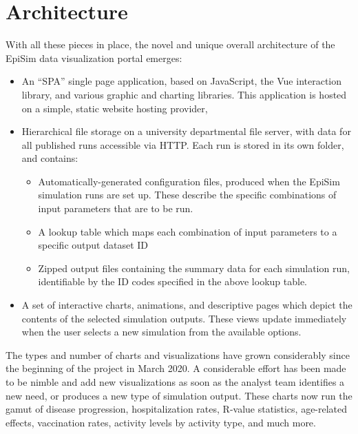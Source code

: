 \hypertarget{covid-architecture}{%
\section{Architecture}\label{architecture}}

With all these pieces in place, the novel and unique overall architecture of the EpiSim data visualization portal emerges:

\begin{itemize}
\item
  An ``SPA'' single page application, based on JavaScript, the Vue interaction library, and various graphic and charting libraries. This application is hosted on a simple, static website hosting provider,
\item
  Hierarchical file storage on a university departmental file server,
  with data for all published runs accessible via HTTP. Each run is
  stored in its own folder, and contains:

  \begin{itemize}
  \item
    Automatically-generated configuration files, produced when the
    EpiSim simulation runs are set up. These describe the specific
    combinations of input parameters that are to be run.
  \item
    A lookup table which maps each combination of input parameters to a
    specific output dataset ID
  \item
    Zipped output files containing the summary data for each simulation
    run, identifiable by the ID codes specified in the above lookup table.
  \end{itemize}
\item
  A set of interactive charts, animations, and descriptive pages which depict the
  contents of the selected simulation outputs. These views update immediately when
  the user selects a new simulation from the available options.
\end{itemize}

The types and number of charts and visualizations have grown considerably since the beginning of the project in March 2020. A considerable effort has been made to be nimble and add new visualizations as soon as the analyst team identifies a new need, or produces a new type of simulation output. These charts now run the gamut of disease progression, hospitalization rates, R-value statistics, age-related effects, vaccination rates, activity levels by activity type, and much more.

